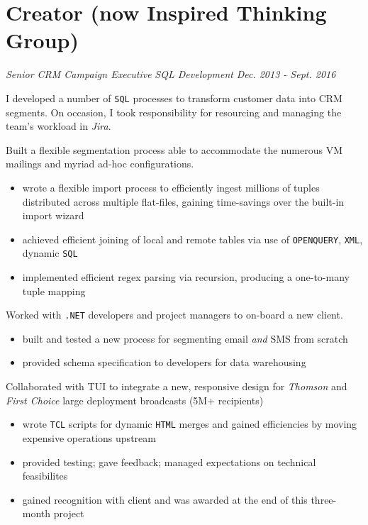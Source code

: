 \documentclass[letterpaper,11pt]{article}
\begin{document}
\section{Creator (now Inspired Thinking Group)}
\textit{Senior CRM Campaign Executive}
\hfill
\textit{SQL Development}
\hfill
\textit{Dec. 2013 - Sept. 2016}
\begin{paragraph}
	I developed a number of \texttt{SQL} processes to transform customer data into CRM segments. On occasion, I took responsibility for resourcing and managing the team's workload in \textit{Jira}.
\end{paragraph}
\begin{description}[style=multiline,leftmargin=3cm]
	\item[Virgin Media Segmentation \tiny\textnormal{\href{https://adrian.ng/SQL/recursion}{adrian.ng/SQL/recursion}} \textnormal{\href{https://adrian.ng/openquery-xml}{adrian.ng/openquery-xml}}]
	      Built a flexible segmentation process able to accommodate the numerous VM mailings and myriad ad-hoc configurations. 
	      \begin{itemize}
		      \item wrote a flexible import process to efficiently ingest millions of tuples distributed across multiple flat-files, gaining time-savings over the built-in import wizard
		      \item achieved efficient joining of local and remote tables via use of \texttt{OPENQUERY}, \texttt{XML}, dynamic \texttt{SQL}
		      \item implemented efficient regex parsing via recursion, producing a one-to-many tuple mapping
	      \end{itemize}
	\item[Volkswagen Onboarding]
	      Worked with \texttt{.NET} developers and project managers to on-board a new client.
	      \begin{itemize}
		      \item built and tested a new process for segmenting email \textit{and} SMS from scratch
		      \item provided schema specification to developers for data warehousing
	      \end{itemize}
	\item[TUI Redesign]
	      Collaborated with TUI to integrate a new, responsive design for \textit{Thomson} and \textit{First Choice} large deployment broadcasts (5M+ recipients)
	      \begin{itemize}
		      \item wrote \texttt{TCL} scripts for dynamic \texttt{HTML} merges and gained efficiencies by moving expensive operations upstream
		      \item provided testing; gave feedback; managed expectations on technical feasibilites
		      \item gained recognition with client and was awarded at the end of this three-month project
	      \end{itemize}
\end{description}
\end{document}
